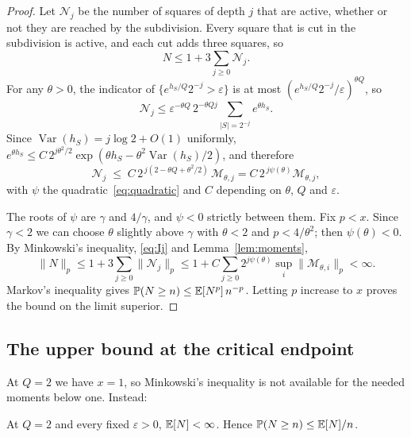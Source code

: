 \begin{proof}
Let $\mathcal N_j$ be the number of squares of depth $j$ that are active, whether or not they are reached
by the subdivision. Every square that is cut in the subdivision is active, and each cut adds
three squares, so
\[
N\le1+3\sum_{j\ge0}\mathcal N_j .
\]
For any $\theta>0$, the indicator of $\{e^{h_S/Q}2^{-j}>\varepsilon\}$ is at most
$(e^{h_S/Q}2^{-j}/\varepsilon)^{\theta Q}$, so
\[
\mathcal N_j\le\varepsilon^{-\theta Q}\,2^{-\theta Qj}\sum_{|S|=2^{-j}}e^{\theta h_S}.
\]
Since $\operatorname{Var}(h_S)=j\log2+O(1)$ uniformly, $e^{\theta h_S}\le
C\,2^{j\theta^2/2}\exp(\theta h_S-\theta^2\operatorname{Var}(h_S)/2)$, and therefore
\begin{equation}\label{eq:Ij}
\mathcal N_j\;\le\;C\,2^{\,j(2-\theta Q+\theta^2/2)}\,\mathcal M_{\theta,j}=C\,2^{\,j\psi(\theta)}\mathcal M_{\theta,j},
\end{equation}
with $\psi$ the quadratic~\eqref{eq:quadratic} and $C$ depending on $\theta$, $Q$ and $\varepsilon$.

The roots of $\psi$ are $\gamma$ and $4/\gamma$, and $\psi<0$ strictly between them. Fix $p<x$. Since
$\gamma<2$ we can choose $\theta$ slightly above $\gamma$ with $\theta<2$ and $p<4/\theta^2$; then
$\psi(\theta)<0$. By Minkowski's inequality, \eqref{eq:Ij} and Lemma~\ref{lem:moments},
\[
\|N\|_p\le1+3\sum_{j\ge0}\|\mathcal N_j\|_p\le1+C\sum_{j\ge0}2^{j\psi(\theta)}\sup_i\|\mathcal M_{\theta,i}\|_p<\infty .
\]
Markov's inequality gives $\mathbb{P}(N\ge n)\le\mathbb{E}[N^p]\,n^{-p}$. Letting $p$ increase to $x$ proves the
bound on the limit superior.
\end{proof}

\subsection{The upper bound at the critical endpoint}

At $Q=2$ we have $x=1$, so Minkowski's inequality is not available for the needed moments below
one. Instead:

\begin{proposition}\label{prop:critupper}
At $Q=2$ and every fixed $\varepsilon>0$, $\mathbb{E}[N]<\infty$. Hence $\mathbb{P}(N\ge n)\le\mathbb{E}[N]/n$.
\end{proposition}

